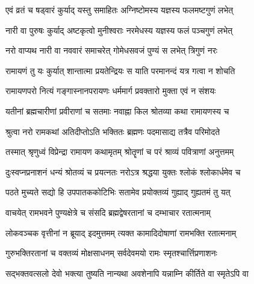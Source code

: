  

\twolineshloka
{एवं व्रतं च षड्वारं कुर्याद् यस्तु समाहितः}
{अग्निष्टोमस्य यज्ञस्य फलमष्टगुणं लभेत्}%

 

\twolineshloka
{नारी वा पुरुषः कुर्याद् अष्टकृत्वो मुनीश्वराः}
{नरमेधस्य यज्ञस्य फलं पञ्चगुणं लभेत्}%

 

\twolineshloka
{नरो वाप्यथ नारी वा नववारं समाचरेत्}
{गोमेधसवजं पुण्यं स लभेत् त्रिगुणं नरः}%

 

\twolineshloka
{रामायणं तु यः कुर्यात् शान्तात्मा प्रयतेन्द्रियः}
{स याति परमानन्दं यत्र गत्वा न शोचति}%

 

\twolineshloka
{रामायणपरो नित्यं गङ्‌गास्नानपरायणः}
{धर्ममार्ग प्रवक्तारो मुक्ता एवं न संशयः}%

 

\twolineshloka
{यतीनां ब्रह्मचारीणां प्रवीराणां च सतमाः}
{नवाह्ना किल श्रोतव्या कथा रामायणस्य च}%

 

\twolineshloka
{श्रुत्वा नरो रामकथां अतिदीप्तोऽति भक्तितः}
{ब्रह्मणः पदमासाद्य तत्रैव परिमोदते}%

 

\twolineshloka
{तस्मात् श्रृणुध्वं विप्रेन्द्रा रामायण कथामृतम्}
{श्रोतॄणां च परं श्राव्यं पवित्राणां अनुत्तमम्}%

 

\twolineshloka
{दुःस्वप्नप्रनाशनं धन्यं श्रोतव्यं च प्रयत्‍नतः}
{नरोऽत्र श्रद्धया युक्तः श्लोकं श्लोकार्धमेव च}%

 

\twolineshloka
{पठते मुच्यते सद्यो हि उपपातककोटिभिः}
{सतामेव प्रयोक्तव्यं गुह्याद् गुह्यतमं तु यत्}%

 

\twolineshloka
{वाचयेत् रामभवने पुण्यक्षेत्रे च संसदि}
{ब्रह्मद्वेषरतानां च दम्भाचार रतात्मनाम्}%

 

\twolineshloka
{लोकवञ्चक वृत्तीनां न ब्रूयाद् इदमुत्तमम्}
{त्यक्त कामादिदोषाणां रामभक्ति रतात्मनाम्}%

 

\twolineshloka
{गुरुभक्तिरतानां च वक्तव्यं मोक्षसाधनम्}
{सर्वदेवमयो रामः स्मृतश्चार्त्तिप्रणाशनः}%

 

\twolineshloka
{सद्‌भक्तवत्सलो देवो भक्त्या तुष्यति नान्यथा}
{अवशेनापि यन्नाम्नि कीर्तिते वा स्मृतेऽपि वा}%

